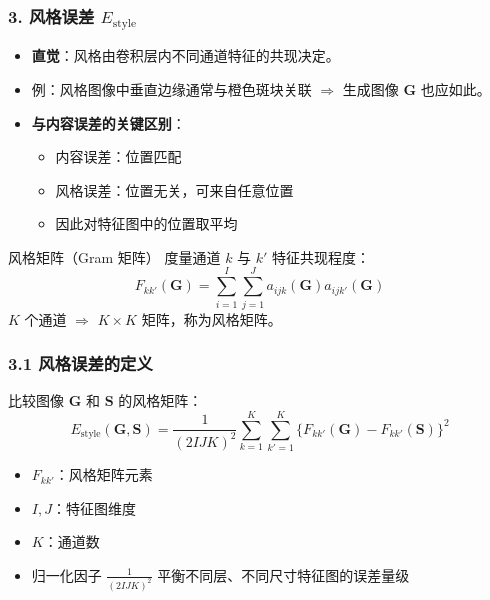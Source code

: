 \documentclass[t,aspectratio=169]{beamer} %
\begin{document}
\begin{frame}
    \frametitle{3. 风格误差 $E_{\text{style}}$}
    \begin{itemize}
        \item \textbf{直觉}：风格由卷积层内\alert{不同通道特征的共现}决定。
        \item 例：风格图像中垂直边缘通常与橙色斑块关联 $\Rightarrow$ 生成图像 $\mathbf{G}$ 也应如此。
        \item \textbf{与内容误差的关键区别}：
        \begin{itemize}
            \item 内容误差：\alert{位置匹配}
            \item 风格误差：\alert{位置无关}，可来自任意位置
            \item 因此对特征图中的位置\alert{取平均}
        \end{itemize}
    \end{itemize}
    \begin{block}{风格矩阵（Gram 矩阵）}
        度量通道 $k$ 与 $k'$ 特征共现程度：
        \begin{equation}
            F_{kk'}(\mathbf{G}) = \sum_{i=1}^{I} \sum_{j=1}^{J} a_{ijk}(\mathbf{G})a_{ijk'}(\mathbf{G})
            \tag{10.15}
        \end{equation}
        $K$ 个通道 $\Rightarrow$ $K \times K$ 矩阵，称为\alert{风格矩阵}。
    \end{block}
\end{frame}

\begin{frame}
    \frametitle{3.1 风格误差的定义}
    比较图像 $\mathbf{G}$ 和 $\mathbf{S}$ 的风格矩阵：
    \begin{equation}
        E_{\text{style}}(\mathbf{G}, \mathbf{S}) = \frac{1}{(2IJK)^2} \sum_{k=1}^{K} \sum_{k'=1}^{K} \{F_{kk'}(\mathbf{G}) - F_{kk'}(\mathbf{S})\}^2
        \tag{10.16}
    \end{equation}
    \begin{itemize}
        \item $F_{kk'}$：风格矩阵元素
        \item $I, J$：特征图维度
        \item $K$：通道数
        \item 归一化因子 $\frac{1}{(2IJK)^2}$ 平衡不同层、不同尺寸特征图的误差量级
    \end{itemize}
\end{frame}
\end{document}

